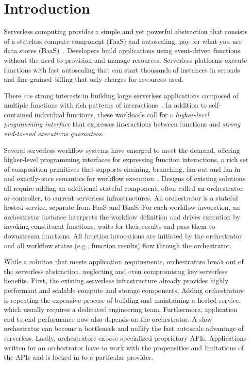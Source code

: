 \section{Introduction}

Serverless computing provides a simple and yet powerful abstraction that
consists of a stateless compute component (FaaS) and autoscaling,
pay-for-what-you-use data stores (BaaS)~\cite{berkeley}. Developers build
applications using event-driven functions without the need to
provision and manage resources. Serverless platforms execute functions with
fast autoscaling that can start thousands of instances in seconds and
fine-grained billing that only charges for resources used.

There are strong interests in building large serverless applications composed
of multiple functions with rich patterns of interactions~\cite{excamera,
pywren, gg-atc, beldi, boki}. In addition to self-contained individual
functions, these workloads call for a \emph{higher-level programming
interface} that expresses interactions between functions and \emph{strong
end-to-end executions guarantees}.

Several serverless workflow systems have emerged to meet the demand, offering
higher-level programming interfaces for expressing function interactions, a
rich set of composition primitives that supports chaining, branching, fan-out
and fan-in and exactly-once semantics for workflow execution~\cite{excamera,
gg-atc, aws-step-functions, google-cloud-composer, google-workflows,
durable-functions}. Designs of existing solutions all require adding an
additional stateful component, often called an orchestrator or controller, to
current serverless infrastructures. An orchestrator is a stateful hosted
service, separate from FaaS and BaaS. For each workflow invocation, an
orchestrator instance interprets the workflow definition and drives execution
by invoking constituent functions, waits for their results and pass them to
downstream functions. All function invocations are initiated by the
orchestrator and all workflow states (e.g., function results) flow through the
orchestrator.

While a solution that meets application requirements, orchestrators break out
of the serverless abstraction, neglecting and even compromising key serverless
benefits. First, the existing serverless infrastructure already provides
highly performant and scalable compute and storage components. Adding
orchestrators is repeating the expensive process of building and maintaining a
hosted service, which usually requires a dedicated engineering team.
Furthermore, application end-to-end performance now also depends on the
orchestrator. A slow orchestrator can become a bottleneck and nullify the fast
autoscale advantage of serverless. Lastly, orchestrators expose specialized
proprietary APIs. Applications written for an orchestrator have to work with
the propensities and limitations of the APIs and is locked in to a particular
provider. 

